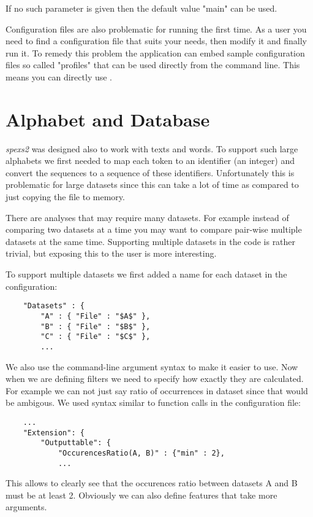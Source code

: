 If no such parameter is given then the default value "main" can be used.

Configuration files are also problematic for running the first time. As a user you need to find a configuration file that suits your needs, then modify it and finally run it. To remedy this problem the application can embed sample configuration files so called "profiles" that can be used directly from the command line. This means you can directly use .

\section{Alphabet and Database}

\emph{spexs2} was designed also to work with texts and words. To support such large alphabets we first needed to map each token to an identifier (an integer) and convert the sequences to a sequence of these identifiers. Unfortunately this is problematic for large datasets since this can take a lot of time as compared to just copying the file to memory.

There are analyses that may require many datasets. For example instead of comparing two datasets at a time you may want to compare pair-wise multiple datasets at the same time. Supporting multiple datasets in the code is rather trivial, but exposing this to the user is more interesting.

To support multiple datasets we first added a name for each dataset in the configuration:

\begin{lstlisting}
    "Datasets" : {
        "A" : { "File" : "$A$" },
        "B" : { "File" : "$B$" },
        "C" : { "File" : "$C$" },
        ...
\end{lstlisting}

We also use the command-line argument syntax to make it easier to use. Now when we are defining filters we need to specify how exactly they are calculated. For example we can not just say ratio of occurrences in dataset since that would be ambigous. We used syntax similar to function calls in the configuration file:

\begin{lstlisting}
    ...
    "Extension": {
        "Outputtable": {
            "OccurencesRatio(A, B)" : {"min" : 2},
            ...
\end{lstlisting}

This allows to clearly see that the occurences ratio between datasets A and B must be at least 2. Obviously we can also define features that take more arguments.

